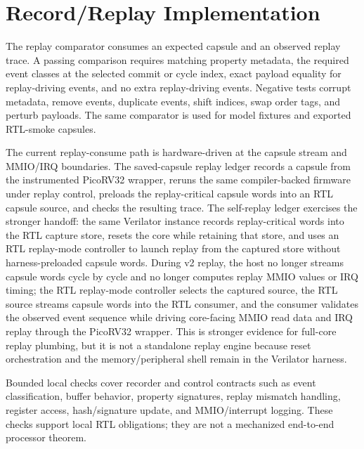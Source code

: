 \section{Record/Replay Implementation}

The replay comparator consumes an expected capsule and an observed replay trace. A passing comparison requires matching property metadata, the required event classes at the selected commit or cycle index, exact payload equality for replay-driving events, and no extra replay-driving events. Negative tests corrupt metadata, remove events, duplicate events, shift indices, swap order tags, and perturb payloads. The same comparator is used for model fixtures and exported RTL-smoke capsules.

The current replay-consume path is hardware-driven at the capsule stream and MMIO/IRQ boundaries. The saved-capsule replay ledger records a capsule from the instrumented PicoRV32 wrapper, reruns the same compiler-backed firmware under replay control, preloads the replay-critical capsule words into an RTL capsule source, and checks the resulting trace. The self-replay ledger exercises the stronger handoff: the same Verilator instance records replay-critical words into the RTL capture store, resets the core while retaining that store, and uses an RTL replay-mode controller to launch replay from the captured store without harness-preloaded capsule words. During v2 replay, the host no longer streams capsule words cycle by cycle and no longer computes replay MMIO values or IRQ timing; the RTL replay-mode controller selects the captured source, the RTL source streams capsule words into the RTL consumer, and the consumer validates the observed event sequence while driving core-facing MMIO read data and IRQ replay through the PicoRV32 wrapper. This is stronger evidence for full-core replay plumbing, but it is not a standalone replay engine because reset orchestration and the memory/peripheral shell remain in the Verilator harness.

Bounded local checks cover recorder and control contracts such as event classification, buffer behavior, property signatures, replay mismatch handling, register access, hash/signature update, and MMIO/interrupt logging. These checks support local RTL obligations; they are not a mechanized end-to-end processor theorem.
